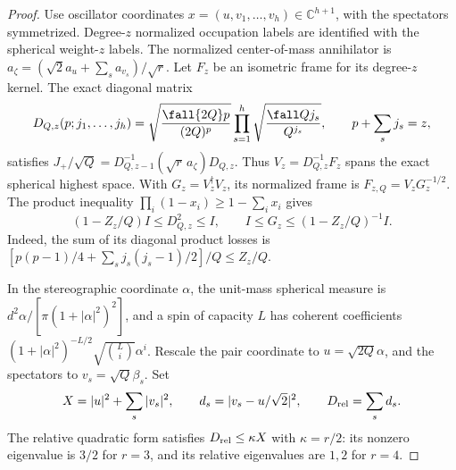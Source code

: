 \begin{proof}
Use oscillator coordinates $x=(u,v_1,\ldots,v_h)\in\mathbb C^{h+1}$,
with the spectators symmetrized. Degree-$z$ normalized occupation labels
are identified with the spherical weight-$z$ labels. The normalized
center-of-mass annihilator is
$a_\zeta=(\sqrt2a_u+\sum_sa_{v_s})/\sqrt r$.
Let $F_z$ be an isometric frame for its degree-$z$ kernel. The exact
diagonal matrix
\begin{equation}
 D_{Q,z}(p;j_1,\ldots,j_h)=
 \sqrt{\frac{\fall{2Q}p}{(2Q)^p}}
 \prod_{s=1}^h\sqrt{\frac{\fall Q{j_s}}{Q^{j_s}}},
 \qquad p+\sum_sj_s=z,
\end{equation}
satisfies $J_+/\sqrt Q=D_{Q,z-1}^{-1}(\sqrt r\,a_\zeta)D_{Q,z}$.
Thus $V_z=D_{Q,z}^{-1}F_z$ spans the exact spherical highest space.
With $G_z=V_z^\dagger V_z$, its normalized frame is
$F_{z,Q}=V_zG_z^{-1/2}$. The product inequality
$\prod_i(1-x_i)\ge1-\sum_ix_i$ gives
\begin{equation}\label{eq:opt-coh-gram}
 (1-Z_z/Q)I\le D_{Q,z}^2\le I,
 \qquad I\le G_z\le(1-Z_z/Q)^{-1}I.
\end{equation}
Indeed, the sum of its diagonal product losses is
$[p(p-1)/4+\sum_sj_s(j_s-1)/2]/Q\le Z_z/Q$.

In the stereographic coordinate $\alpha$, the unit-mass spherical measure
is $d^2\alpha/[\pi(1+|\alpha|^2)^2]$, and a spin of capacity $L$ has
coherent coefficients
$(1+|\alpha|^2)^{-L/2}\sqrt{\binom Li}\alpha^i$.
Rescale the pair coordinate to $u=\sqrt{2Q}\alpha$, and the spectators
to $v_s=\sqrt Q\beta_s$. Set
\begin{equation}
 X=|u|^2+\sum_s|v_s|^2,\qquad
 d_s=|v_s-u/\sqrt2|^2,\qquad D_{\rm rel}=\sum_sd_s.
\end{equation}
The relative quadratic form satisfies $D_{\rm rel}\le\kappa X$ with
$\kappa=r/2$: its nonzero eigenvalue is $3/2$ for $r=3$, and its relative
eigenvalues are $1,2$ for $r=4$.


\end{proof}
